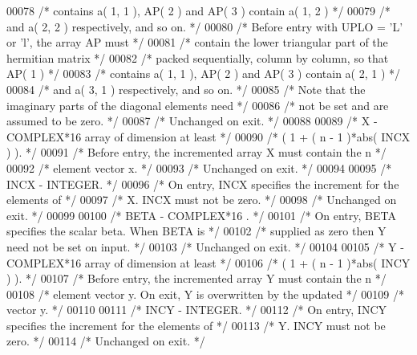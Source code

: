 \begin{DoxyCode}
00078 \textcolor{comment}{/*           contains a( 1, 1 ), AP( 2 ) and AP( 3 ) contain a( 1, 2 ) */}
00079 \textcolor{comment}{/*           and a( 2, 2 ) respectively, and so on. */}
00080 \textcolor{comment}{/*           Before entry with UPLO = 'L' or 'l', the array AP must */}
00081 \textcolor{comment}{/*           contain the lower triangular part of the hermitian matrix */}
00082 \textcolor{comment}{/*           packed sequentially, column by column, so that AP( 1 ) */}
00083 \textcolor{comment}{/*           contains a( 1, 1 ), AP( 2 ) and AP( 3 ) contain a( 2, 1 ) */}
00084 \textcolor{comment}{/*           and a( 3, 1 ) respectively, and so on. */}
00085 \textcolor{comment}{/*           Note that the imaginary parts of the diagonal elements need */}
00086 \textcolor{comment}{/*           not be set and are assumed to be zero. */}
00087 \textcolor{comment}{/*           Unchanged on exit. */}
00088 
00089 \textcolor{comment}{/*  X      - COMPLEX*16       array of dimension at least */}
00090 \textcolor{comment}{/*           ( 1 + ( n - 1 )*abs( INCX ) ). */}
00091 \textcolor{comment}{/*           Before entry, the incremented array X must contain the n */}
00092 \textcolor{comment}{/*           element vector x. */}
00093 \textcolor{comment}{/*           Unchanged on exit. */}
00094 
00095 \textcolor{comment}{/*  INCX   - INTEGER. */}
00096 \textcolor{comment}{/*           On entry, INCX specifies the increment for the elements of */}
00097 \textcolor{comment}{/*           X. INCX must not be zero. */}
00098 \textcolor{comment}{/*           Unchanged on exit. */}
00099 
00100 \textcolor{comment}{/*  BETA   - COMPLEX*16      . */}
00101 \textcolor{comment}{/*           On entry, BETA specifies the scalar beta. When BETA is */}
00102 \textcolor{comment}{/*           supplied as zero then Y need not be set on input. */}
00103 \textcolor{comment}{/*           Unchanged on exit. */}
00104 
00105 \textcolor{comment}{/*  Y      - COMPLEX*16       array of dimension at least */}
00106 \textcolor{comment}{/*           ( 1 + ( n - 1 )*abs( INCY ) ). */}
00107 \textcolor{comment}{/*           Before entry, the incremented array Y must contain the n */}
00108 \textcolor{comment}{/*           element vector y. On exit, Y is overwritten by the updated */}
00109 \textcolor{comment}{/*           vector y. */}
00110 
00111 \textcolor{comment}{/*  INCY   - INTEGER. */}
00112 \textcolor{comment}{/*           On entry, INCY specifies the increment for the elements of */}
00113 \textcolor{comment}{/*           Y. INCY must not be zero. */}
00114 \textcolor{comment}{/*           Unchanged on exit. */}

\end{DoxyCode}
